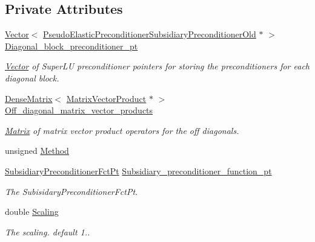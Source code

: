 \subsection*{Private Attributes}
\begin{DoxyCompactItemize}
\item 
\hyperlink{classoomph_1_1Vector}{Vector}$<$ \hyperlink{classoomph_1_1PseudoElasticPreconditionerSubsidiaryPreconditionerOld}{Pseudo\+Elastic\+Preconditioner\+Subsidiary\+Preconditioner\+Old} $\ast$ $>$ \hyperlink{classoomph_1_1PseudoElasticPreconditionerSubsidiaryBlockPreconditionerOld_a41bd3e3258d55a595df9af6690df2d2f}{Diagonal\+\_\+block\+\_\+preconditioner\+\_\+pt}
\begin{DoxyCompactList}\small\item\em \hyperlink{classoomph_1_1Vector}{Vector} of Super\+LU preconditioner pointers for storing the preconditioners for each diagonal block. \end{DoxyCompactList}\item 
\hyperlink{classoomph_1_1DenseMatrix}{Dense\+Matrix}$<$ \hyperlink{classoomph_1_1MatrixVectorProduct}{Matrix\+Vector\+Product} $\ast$ $>$ \hyperlink{classoomph_1_1PseudoElasticPreconditionerSubsidiaryBlockPreconditionerOld_ac736d6b0390de55bb96cc9475a4cabac}{Off\+\_\+diagonal\+\_\+matrix\+\_\+vector\+\_\+products}
\begin{DoxyCompactList}\small\item\em \hyperlink{classoomph_1_1Matrix}{Matrix} of matrix vector product operators for the off diagonals. \end{DoxyCompactList}\item 
unsigned \hyperlink{classoomph_1_1PseudoElasticPreconditionerSubsidiaryBlockPreconditionerOld_a6b45cbf207717b9ffe326041f78ea85b}{Method}
\item 
\hyperlink{classoomph_1_1PseudoElasticPreconditionerSubsidiaryBlockPreconditionerOld_a85f57923e70244d5fde0538946eb8c3d}{Subsidiary\+Preconditioner\+Fct\+Pt} \hyperlink{classoomph_1_1PseudoElasticPreconditionerSubsidiaryBlockPreconditionerOld_a376d5fd2ddf9f367854b41478a269ae2}{Subsidiary\+\_\+preconditioner\+\_\+function\+\_\+pt}
\begin{DoxyCompactList}\small\item\em The Subisidary\+Preconditioner\+Fct\+Pt. \end{DoxyCompactList}\item 
double \hyperlink{classoomph_1_1PseudoElasticPreconditionerSubsidiaryBlockPreconditionerOld_a588f4623c606d01c3e3feb3c09023f03}{Scaling}
\begin{DoxyCompactList}\small\item\em The scaling. default 1.. \end{DoxyCompactList}\end{DoxyCompactItemize}
